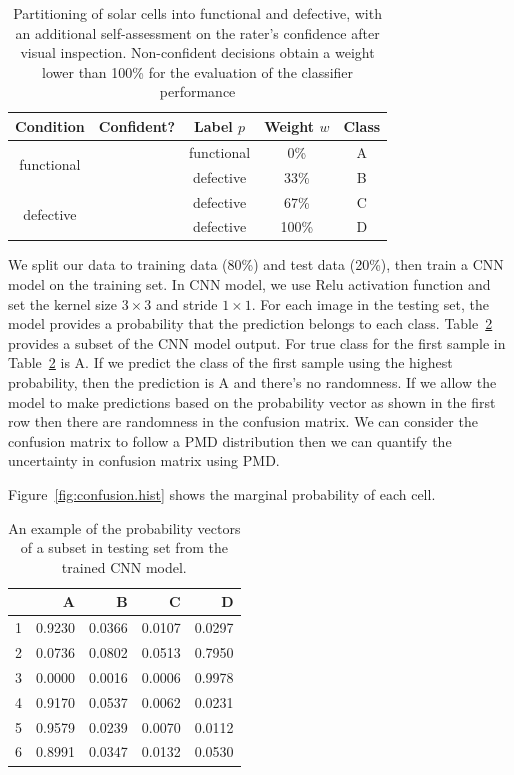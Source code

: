 \documentclass[12pt]{article}
\newcommand{\cmark}{\ding{51}}%
\newcommand{\xmark}{\ding{55}}%
\begin{document}
\begin{table}[h!]
	\centering
	\caption{Partitioning of solar cells into functional and defective, with an additional self-assessment on the rater's confidence after visual inspection. Non-confident decisions obtain a weight lower than 100\% for the evaluation of the classifier performance }
	\begin{tabular}{c|c|c|c|c}
		\hline
		\hline
		Condition  & Confident?  &  Label $p$ & Weight $w$ & Class \\
		\hline
		\multirow{2}{*}{functional} & \cmark & functional & 0\% & A\\
		& \xmark& defective  & 33\% & B\\
		\hline
		\multirow{2}{*}{defective} & \xmark & defective & 67\% & C\\
		& \cmark & defective & 100\%  &D\\
		\hline
		\hline
	\end{tabular}
	
	
	
	\label{tbl:el.label}
	
\end{table}

We split our data to training data (80\%) and test data (20\%), then train a CNN model on the training set. In CNN model, we use Relu activation function and set the kernel size $3 \times 3$ and stride $1 \times 1$. For each image in the testing set, the model provides a probability that the prediction belongs to each class. Table~\ref{tbl:elpmat} provides a subset of the CNN model output. For true class for the first sample in Table~\ref{tbl:elpmat} is A. If we predict the class of the first sample using the highest probability, then the prediction is A and there's no randomness. If we allow the model to make predictions based on the probability vector as shown in the first row then there are randomness in the confusion matrix. We can consider the confusion matrix to follow a PMD distribution then we can quantify the uncertainty in confusion matrix using PMD.

Figure~\ref{fig:confusion.hist} shows the marginal probability of each cell. 


\begin{table}[ht]
\centering
\caption{An example of the probability vectors of a subset in testing set from the trained CNN model.}
\label{tbl:elpmat}
\begin{tabular}{rrrrr}
  \hline
 & A & B & C & D \\
  \hline
1 & 0.9230 & 0.0366 & 0.0107 & 0.0297 \\
  2 & 0.0736 & 0.0802 & 0.0513 & 0.7950 \\
  3 & 0.0000 & 0.0016 & 0.0006 & 0.9978 \\
  4 & 0.9170 & 0.0537 & 0.0062 & 0.0231 \\
  5 & 0.9579 & 0.0239 & 0.0070 & 0.0112 \\
  6 & 0.8991 & 0.0347 & 0.0132 & 0.0530 \\
   \hline
\end{tabular}
\end{table}
\end{document}
